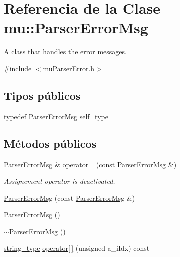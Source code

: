 \hypertarget{classmu_1_1_parser_error_msg}{}\section{Referencia de la Clase mu\+:\+:Parser\+Error\+Msg}
\label{classmu_1_1_parser_error_msg}


A class that handles the error messages.  




{\ttfamily \#include $<$mu\+Parser\+Error.\+h$>$}

\subsection*{Tipos públicos}
\begin{DoxyCompactItemize}
\item 
typedef \hyperlink{classmu_1_1_parser_error_msg}{Parser\+Error\+Msg} \hyperlink{classmu_1_1_parser_error_msg_a021c69b193a67c3f907d94648a2c23ef}{self\+\_\+type}
\end{DoxyCompactItemize}
\subsection*{Métodos públicos}
\begin{DoxyCompactItemize}
\item 
\hyperlink{classmu_1_1_parser_error_msg}{Parser\+Error\+Msg} \& \hyperlink{classmu_1_1_parser_error_msg_a032500259ac54ce82fb08f696f07f2d7}{operator=} (const \hyperlink{classmu_1_1_parser_error_msg}{Parser\+Error\+Msg} \&)
\begin{DoxyCompactList}\small\item\em Assignement operator is deactivated. \end{DoxyCompactList}\item 
\hyperlink{classmu_1_1_parser_error_msg_a3582c28dc06a0c08f6ddcba2c423491e}{Parser\+Error\+Msg} (const \hyperlink{classmu_1_1_parser_error_msg}{Parser\+Error\+Msg} \&)
\item 
\hyperlink{classmu_1_1_parser_error_msg_aac3208ea3586efee10cd75ee6f42ee25}{Parser\+Error\+Msg} ()
\item 
\hyperlink{classmu_1_1_parser_error_msg_a3d00e0f669c764e8d75509e8d6152d7b}{$\sim$\+Parser\+Error\+Msg} ()
\item 
\hyperlink{namespacemu_ae9f8b44d9a97dd397180891e8390c3e9}{string\+\_\+type} \hyperlink{classmu_1_1_parser_error_msg_a50b72ec4614d582045fa97c273b2e4ff}{operator\mbox{[}$\,$\mbox{]}} (unsigned a\+\_\+i\+Idx) const 
\end{DoxyCompactItemize}
